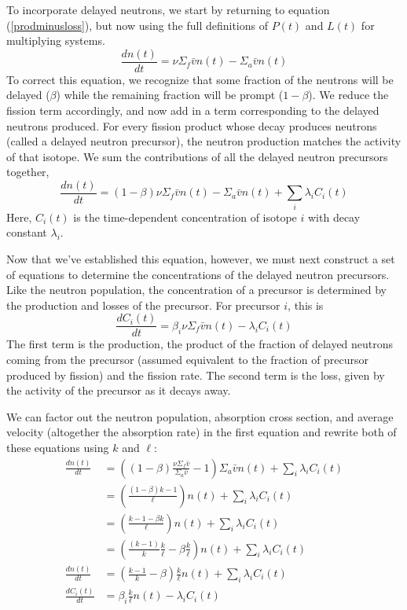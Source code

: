 \documentclass{report}
\begin{document}
To incorporate delayed neutrons, we start by returning to equation (\ref{prodminusloss}), but now using the full definitions of $P(t)$ and $L(t)$ for multiplying systems.
$$ \frac{dn(t)}{dt} = \nu\Sigma_f\bar{v}n(t) - \Sigma_a\bar{v}n(t) $$
To correct this equation, we recognize that some fraction of the neutrons will be delayed ($\beta$) while the remaining fraction will be prompt ($1-\beta$). We reduce the fission term accordingly, and now add in a term corresponding to the delayed neutrons produced. For every fission product whose decay produces neutrons (called a delayed neutron precursor), the neutron production matches the activity of that isotope. We sum the contributions of all the delayed neutron precursors together,
$$ \frac{dn(t)}{dt} = (1-\beta)\nu\Sigma_f\bar{v}n(t) - \Sigma_a\bar{v}n(t) + \sum_i \lambda_i C_i(t)$$
Here, $C_i(t)$ is the time-dependent concentration of isotope $i$ with decay constant $\lambda_i$.

Now that we've established this equation, however, we must next construct a set of equations to determine the concentrations of the delayed neutron precursors. Like the neutron population, the concentration of a precursor is determined by the production and losses of the precursor. For precursor $i$, this is
$$ \frac{dC_i(t)}{dt} = \beta_i \nu \Sigma_f \bar{v} n(t) - \lambda_i C_i(t) $$
The first term is the production, the product of the fraction of delayed neutrons coming from the precursor (assumed equivalent to the fraction of precursor produced by fission) and the fission rate. The second term is the loss, given by the activity of the precursor as it decays away. 

We can factor out the neutron population, absorption cross section, and average velocity (altogether the absorption rate) in the first equation and rewrite both of these equations using $k$ and $\ell$:
\begin{align*}
\frac{dn(t)}{dt}	&= \left((1-\beta)\frac{\nu\Sigma_f\bar{v}}{\Sigma_a\bar{v}} - 1\right)\Sigma_a \bar{v} n(t) + \sum_i \lambda_i C_i(t) \\
					&= \left(\frac{(1-\beta)k - 1}{\ell}\right)n(t) + \sum_i \lambda_i C_i(t) \\
					&= \left(\frac{k - 1 -\beta k}{\ell}\right)n(t) + \sum_i \lambda_i C_i(t) \\
					&= \left(\frac{(k - 1)}{k}\frac{k}{\ell} - \beta\frac{k}{\ell}\right)n(t) + \sum_i \lambda_i C_i(t) \\
\frac{dn(t)}{dt}	&= \left(\frac{k - 1}{k} - \beta\right)\frac{k}{\ell}n(t) + \sum_i \lambda_i C_i(t) \\
\frac{dC_i(t)}{dt} &= \beta_i \frac{k}{\ell} n(t) - \lambda_i C_i(t)
\end{align*}
\end{document}
